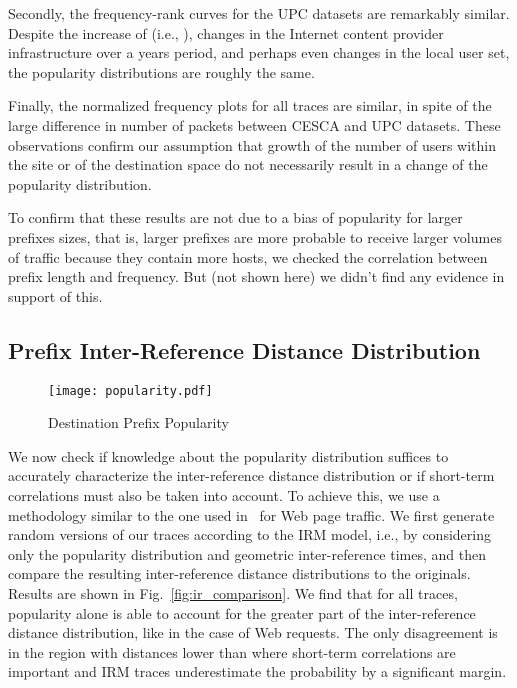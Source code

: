 \documentclass[twocolumn, 10pt]{article}
\theoremstyle{plain}
\begin{document}
Secondly, the frequency-rank curves for the UPC datasets are remarkably
similar. Despite the   increase of  (i.e., ),
changes in the Internet content provider infrastructure over a  years
period, and perhaps even changes in the local user set, the popularity
distributions are roughly the same. 

Finally, the normalized frequency plots for all traces are similar, in spite
of the large difference in number of packets between CESCA and UPC datasets.
These observations confirm our assumption that growth of the number of users
within the site or of the destination space do not necessarily result in a
change of the popularity distribution. 


To confirm that these results are not due to a bias of popularity for larger
prefixes sizes, that is, larger prefixes are more probable to receive larger
volumes of traffic because they contain more hosts, we checked the correlation
between prefix length and frequency. But (not shown here) we didn't find any
evidence in support of this. 




\subsection{Prefix Inter-Reference Distance Distribution}

\begin{figure}[t!]
    \centering
    \texttt{[image: popularity.pdf]}
    \caption{Destination Prefix Popularity}
    \label{fig:pop}
\end{figure}

We now check if knowledge about the popularity distribution suffices to
accurately characterize the inter-reference distance distribution or if
short-term correlations must also be taken into account. To achieve this, we
use a methodology similar to the one used in~\cite{jin:web_tloc} for Web page
traffic. We first generate random versions of our traces according to the IRM
model, i.e., by considering only the popularity distribution and geometric
inter-reference times, and then compare the resulting inter-reference distance
distributions to the originals. Results are shown in
Fig.~\ref{fig:ir_comparison}. We find that for all traces, popularity alone is
able to account for the greater part of the inter-reference distance
distribution, like in the case of Web requests. The only disagreement is in
the region with distances lower than  where short-term correlations are
important and IRM traces underestimate the probability by a significant
margin.
\end{document}
